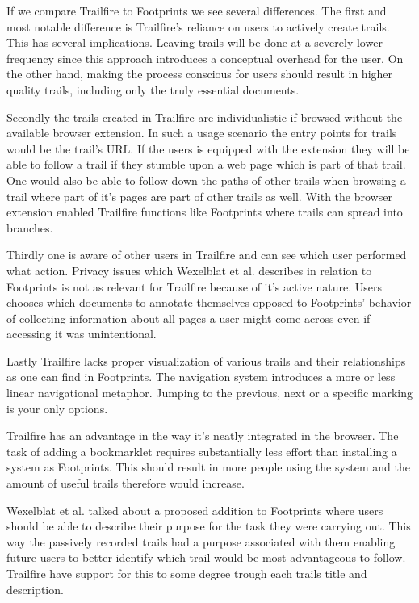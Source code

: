 \documentclass[12pt,a4paper]{article}
\begin{document}
If we compare Trailfire to Footprints we see several differences. The first
and most notable difference is Trailfire's reliance on users to actively
create trails. This has several implications. Leaving trails will be done at a
severely lower frequency since this approach introduces a conceptual overhead
for the user. On the other hand, making the process conscious for users should
result in higher quality trails, including only the truly essential documents.

Secondly the trails created in Trailfire are individualistic if browsed
without the
available browser extension. In such a usage scenario the entry points for
trails would be the trail's URL. If the users is equipped with the extension
they will be able to follow a trail if they stumble upon a web page which is
part of that trail. One would also be able to follow down the paths of other
trails when browsing a trail where part of it's pages are part of other trails
as well. With the browser extension enabled Trailfire functions like
Footprints where trails can spread into branches.

Thirdly one is aware of other users in Trailfire and can see which user
performed what action. Privacy issues which Wexelblat et al. describes in
relation to Footprints is not as relevant for Trailfire because of it's active
nature. Users chooses which documents to annotate themselves opposed to
Footprints' behavior of collecting information about all pages a user
might come across even if accessing it was unintentional.

Lastly Trailfire lacks proper visualization of various trails and their
relationships as one can find in Footprints. The navigation system introduces
a more or less linear navigational metaphor. Jumping to the previous, next or
a specific marking is your only options.

Trailfire has an advantage in the way it's neatly integrated in the browser.
The task of adding a bookmarklet requires substantially less effort than
installing a system as Footprints. This should result in more people using the
system and the amount of useful trails therefore would increase.

Wexelblat et al. talked about a proposed addition to Footprints where users
should be able to describe their purpose for the task they were carrying out.
This way the passively recorded trails had a purpose associated with them
enabling future users to better identify which trail would be most
advantageous to follow. Trailfire have support for this to some degree trough
each trails title and description.
\end{document}
